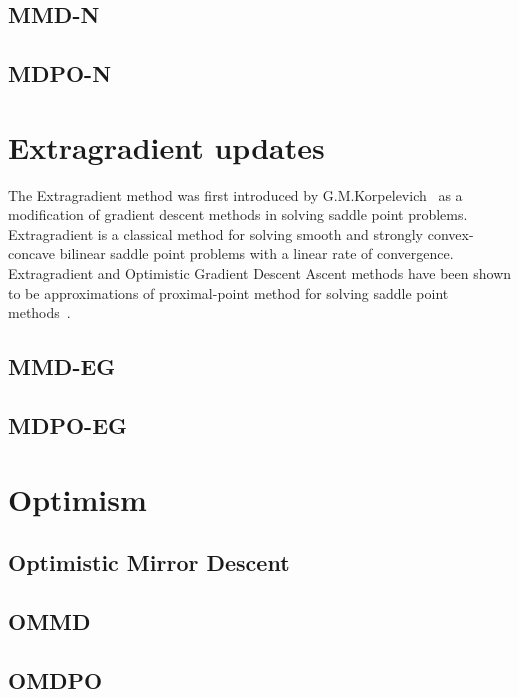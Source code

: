 \subsection{MMD-N}

\subsection{MDPO-N}

\section{Extragradient updates}

The Extragradient method was first introduced by
G.M.Korpelevich~\cite{korpelevichextragradient1976} as a modification of gradient descent methods
in solving saddle point problems.
Extragradient is a classical method for solving smooth and strongly convex-concave bilinear saddle
point problems with a linear rate of convergence.
Extragradient and Optimistic Gradient Descent Ascent methods have been shown to be approximations
of proximal-point method for solving saddle point methods~\cite{mokhtariUnified2020}.

\subsection{MMD-EG}

\subsection{MDPO-EG}

\section{Optimism}


\subsection{Optimistic Mirror Descent}

\subsection{OMMD}
\subsection{OMDPO}

